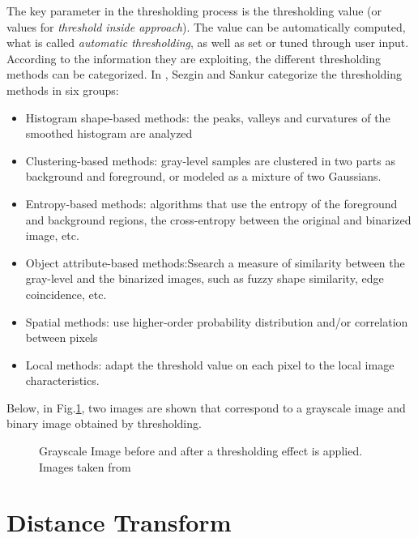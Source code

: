 The key parameter in the thresholding process is the thresholding value (or values for
\emph{threshold inside approach}). The value can be automatically computed, what is called
\emph{automatic thresholding}, as well as set or tuned through user input.\\
According to the information they are exploiting, the different thresholding methods can be 
categorized. In \cite[p.147]{thres}, Sezgin and Sankur categorize the thresholding methods in
six groups:
\begin{itemize}
\item Histogram shape-based methods: the peaks, valleys and curvatures of the smoothed
histogram are analyzed
\item Clustering-based methods: gray-level samples are clustered in two parts as
background and foreground, or modeled as a mixture of two Gaussians.
\item Entropy-based methods: algorithms that use the entropy of the foreground 
and background regions, the cross-entropy between the original and binarized image, 
etc.
\item Object attribute-based methods:Ssearch a measure of similarity between the 
gray-level and the binarized images, such as fuzzy shape similarity, 
edge coincidence, etc.
\item Spatial methods: use higher-order probability distribution and/or 
correlation between pixels
\item Local methods: adapt the threshold value on each pixel
to the local image characteristics.
\end{itemize}

Below, in Fig.\ref{fig:thres1}, two images are shown that correspond to a grayscale image
and binary image obtained by thresholding.

\begin{figure}
  \centering
\qquad
  \caption{Grayscale Image before and after a thresholding effect is applied. Images taken from \cite{web:thresholding}}
  \label{fig:thres1}
\end{figure}

\section{Distance Transform}
\label{sec:dt}

